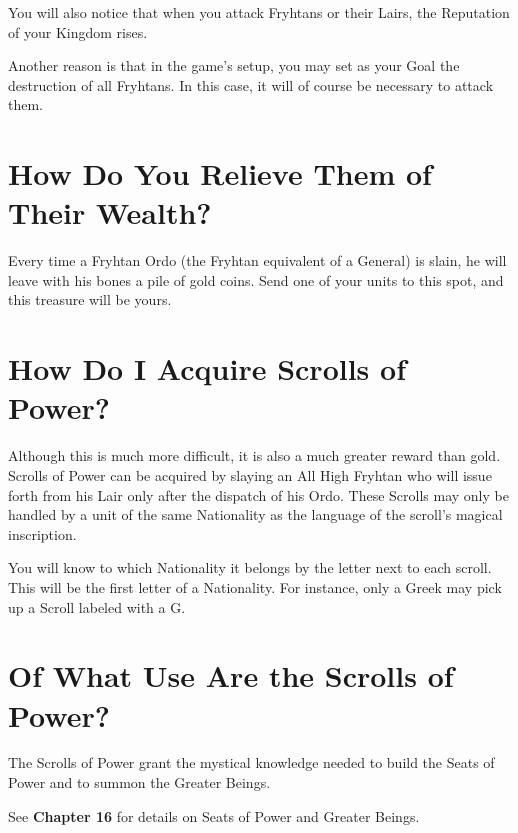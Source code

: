 You will also notice that when you attack Fryhtans or their Lairs, the Reputation of your Kingdom rises.

Another reason is that in the game’s setup, you may set as your Goal the destruction of all Fryhtans. In this case, it will of course be necessary to attack them.

\section{How Do You Relieve Them of Their Wealth?}


Every time a Fryhtan Ordo (the Fryhtan equivalent of a General) is slain, he will leave with his bones a pile of gold coins. Send one of your units to this spot, and this treasure will be yours.

\section{How Do I Acquire Scrolls of Power?}


Although this is much more difficult, it is also a much greater reward than gold. Scrolls of Power can be acquired by slaying an All High Fryhtan who will issue forth from his Lair only after the dispatch of his Ordo. These Scrolls may only be handled by a unit of the same Nationality as the language of the scroll’s magical inscription.

You will know to which Nationality it belongs by the letter next to each scroll. This will be the first letter of a Nationality. For instance, only a Greek may pick up a Scroll labeled with a G.

\section{Of What Use Are the Scrolls of Power?}


The Scrolls of Power grant the mystical knowledge needed to build the Seats of Power and to summon the Greater Beings.

See \textbf{Chapter 16} for details on Seats of Power and Greater Beings.
